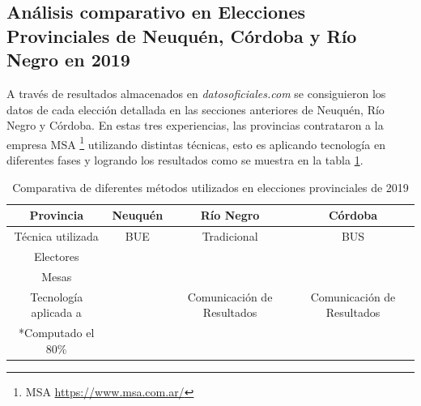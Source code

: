 \subsection{Análisis comparativo en Elecciones Provinciales de Neuquén, Córdoba y Río Negro en 2019}
A través de resultados almacenados en \textit{datosoficiales.com} se consiguieron los datos de cada elección detallada en las secciones anteriores de Neuquén, Río Negro y Córdoba.   \newline
En estas tres experiencias, las provincias contrataron a la empresa MSA \footnote{MSA \url{https://www.msa.com.ar/}} utilizando distintas técnicas, esto es aplicando tecnología en diferentes fases y logrando los resultados como se muestra en la tabla \ref{tab:comparativa}.
\begin{table}[]
    \centering
    \begin{tabular}{c|c|c|c}
         Provincia & Neuquén& Río Negro & Córdoba   \\
         \hline
         Técnica utilizada& BUE & Tradicional & BUS \\
         \hline
         Electores& & & \\
         \hline
         Mesas& & & \\
         \hline
         Tecnología aplicada a& &Comunicación de Resultados & Comunicación de Resultados \\
         \hline
         *Computado el 80\% & & & \\
         \hline
    \end{tabular}
    \caption{Comparativa de diferentes métodos utilizados en elecciones provinciales de 2019}
    \label{tab:comparativa}
\end{table}


